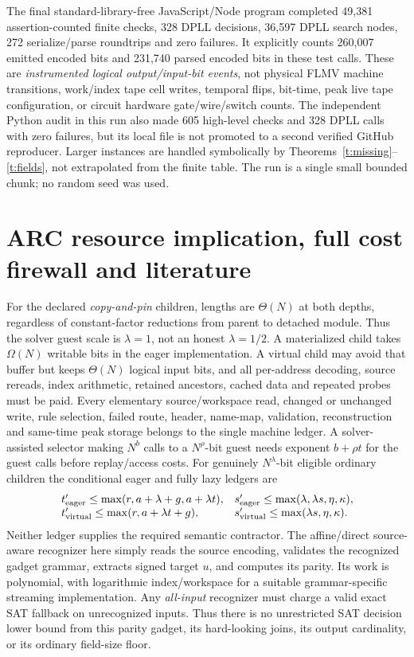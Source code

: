 \documentclass[11pt]{article}
\begin{document}
The final standard-library-free JavaScript/Node program
completed 49,381 assertion-counted finite checks,
328 DPLL decisions, 36,597 DPLL search nodes,
272 serialize/parse roundtrips and zero failures.
It explicitly counts 260,007 emitted encoded bits and
231,740 parsed encoded bits in these test calls.
These are \emph{instrumented logical output/input-bit events},
not physical FLMV machine transitions, work/index tape cell
writes, temporal flips, bit-time, peak live tape configuration,
or circuit hardware gate/wire/switch counts.
The independent Python audit in this run also made 605
high-level checks and 328 DPLL calls with zero failures,
but its local file is not promoted to a second verified GitHub
reproducer. Larger instances are handled symbolically by
Theorems~\ref{t:missing}--\ref{t:fields}, not extrapolated
from the finite table. The run is a single small bounded chunk;
no random seed was used.

\section{ARC resource implication, full cost firewall and literature}
For the declared \emph{copy-and-pin} children, lengths are
$\Theta(N)$ at both depths, regardless of constant-factor
reductions from parent to detached module. Thus the solver guest
scale is $\lambda=1$, not an honest $\lambda=1/2$.
A materialized child takes $\Omega(N)$ writable bits in the
eager implementation. A virtual child may avoid that
buffer but keeps $\Theta(N)$ logical input bits, and all
per-address decoding, source rereads, index arithmetic,
retained ancestors, cached data and repeated probes
must be paid. Every elementary source/workspace read,
changed or unchanged write, rule selection, failed route,
header, name-map, validation, reconstruction and same-time
peak storage belongs to the single machine ledger.
A solver-assisted selector making $N^b$ calls to a
$N^\rho$-bit guest needs exponent $b+\rho t$ for the
guest calls before replay/access costs. For genuinely
$N^\lambda$-bit eligible ordinary children the conditional
eager and fully lazy ledgers are
\[
 \begin{array}{ll}
 t'_{\rm eager}\le\max(r,a+\lambda+g,a+\lambda t),&
 s'_{\rm eager}\le\max(\lambda,\lambda s,\eta,\kappa),\\
 t'_{\rm virtual}\le\max(r,a+\lambda t+g),&
 s'_{\rm virtual}\le\max(\lambda s,\eta,\kappa).
 \end{array}
\]
Neither ledger supplies the required semantic contractor.
The affine/direct source-aware recognizer here simply
reads the source encoding, validates the recognized gadget
grammar, extracts signed target $u$, and computes its parity.
Its work is polynomial, with logarithmic index/workspace
for a suitable grammar-specific streaming implementation.
Any \emph{all-input} recognizer must charge a valid exact SAT
fallback on unrecognized inputs. Thus there is no
unrestricted SAT decision lower bound from this parity
gadget, its hard-looking joins, its output cardinality, or
its ordinary field-size floor.
\end{document}
